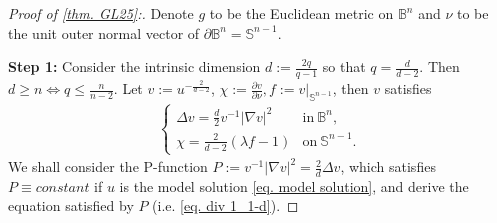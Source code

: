 \documentclass[12pt]{amsart}
\numberwithin{equation}{section}
\numberwithin{lemma}{section}
\numberwithin{proposition}{section}
\numberwithin{corollary}{section}
\numberwithin{remark}{section}
\begin{document}
\begin{proof}[Proof of \cref{thm. GL25}:] Denote $g$ to be the Euclidean metric on $\mathbb{B}^n$ and $\nu$ to be the unit outer normal vector of $\partial \mathbb{B}^n=\mathbb{S}^{n-1}$.

\textbf{Step 1:}    Consider the intrinsic dimension $d:=\frac{2q}{q-1}$ so that $q=\frac{d}{d-2}$. Then $d\geq n\Leftrightarrow q\leq \frac{n}{n-2}$. Let $v:=u^{-\frac{2}{d-2}}$, $\chi:=\frac{\partial v}{\partial \nu}, f:=v|_{\mathbb{S}^{n-1}}$, then $v$ satisfies
    \begin{align}\label{eq. PDE of v}
        \begin{cases}
            \Delta v=\frac{d}{2}v^{-1}|\nabla v|^2 &\mathrm{in}\ \mathbb{B}^n,\\
            \chi=\frac{2}{d-2}(\lambda f-1) &\mathrm{on}\ \mathbb{S}^{n-1}.
        \end{cases}
    \end{align}
    We shall consider the P-function $P:=v^{-1}|\nabla v|^2=\frac{2}{d}\Delta v$, which satisfies $P\equiv constant$ if $u$ is the model solution \cref{eq. model solution}, and derive the equation satisfied by $P$ (i.e. \cref{eq. div 1_1-d}).
    

\end{proof}
\end{document}
